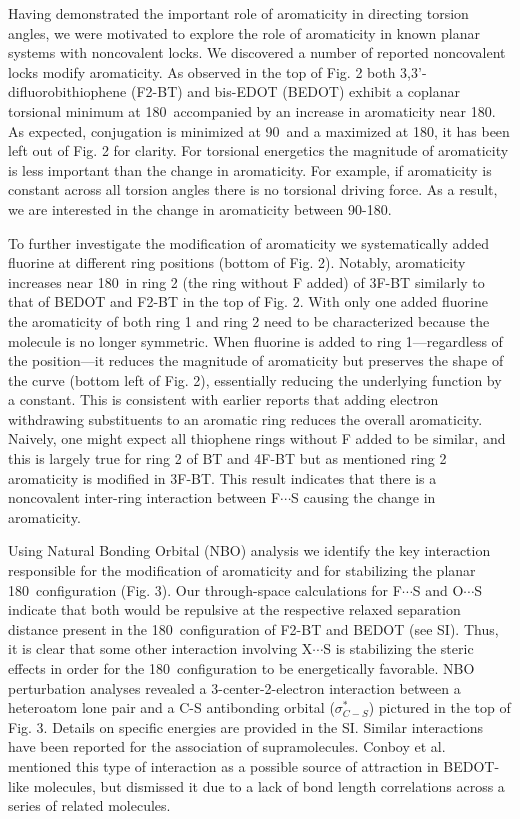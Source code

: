 Having demonstrated the important role of aromaticity in directing torsion angles, we were motivated to explore the role of aromaticity in known planar systems with noncovalent locks. We discovered a number of reported noncovalent locks modify aromaticity. As observed in the top of Fig. 2 both  3,3'-difluorobithiophene (F2-BT) and bis-EDOT (BEDOT) exhibit a coplanar torsional minimum at 180\textdegree \ accompanied by an increase in aromaticity near 180\textdegree. As expected, conjugation is minimized at 90\textdegree \ and a maximized at 180\textdegree, it has been left out of Fig. 2 for clarity. For torsional energetics the magnitude of aromaticity is less important than the change in aromaticity. For example, if aromaticity is constant across all torsion angles there is no torsional driving force. As a result, we are interested in the change in aromaticity between 90-180\textdegree. 

To further investigate the modification of aromaticity we systematically added fluorine at different ring positions (bottom of Fig. 2). Notably, aromaticity increases near 180\textdegree \ in ring 2 (the ring without F added) of 3F-BT similarly to that of BEDOT and F2-BT in the top of Fig. 2. With only one added fluorine the aromaticity of both ring 1 and ring 2 need to be characterized because the molecule is no longer symmetric. When fluorine is added to ring 1---regardless of the position---it reduces the magnitude of aromaticity but preserves the shape of the curve (bottom left of Fig. 2), essentially reducing the underlying function by a constant. This is consistent with earlier reports that adding electron withdrawing substituents to an aromatic ring reduces the overall aromaticity.\cite{Krygowski2014} Naively, one might expect all thiophene rings without F added to be similar, and this is largely true for ring 2 of BT and 4F-BT but as mentioned ring 2 aromaticity is modified in 3F-BT. This result indicates that there is a noncovalent inter-ring interaction between F$\cdots$S causing the change in aromaticity.

Using Natural Bonding Orbital (NBO) analysis we identify the key interaction responsible for the modification of aromaticity and for stabilizing the planar 180\textdegree \ configuration (Fig. 3). Our through-space calculations for F$\cdots$S and O$\cdots$S indicate that both would be repulsive at the respective relaxed separation distance present in the 180\textdegree \ configuration of F2-BT and BEDOT (see SI). Thus, it is clear that some other interaction involving X$\cdots$S is stabilizing the steric effects in order for the 180\textdegree \ configuration to be energetically favorable. NBO perturbation analyses revealed a 3-center-2-electron interaction between a heteroatom lone pair and a C-S antibonding orbital ($\sigma^{*}_{C-S}$) pictured in the top of Fig. 3. Details on specific energies are provided in the SI. Similar interactions have been reported for the association of supramolecules.\cite{Cozzolino2005} Conboy et al. mentioned this type of interaction as a possible source of attraction in BEDOT-like molecules, but dismissed it due to a lack of bond length correlations across a series of related molecules.\cite{Conboy2016}

